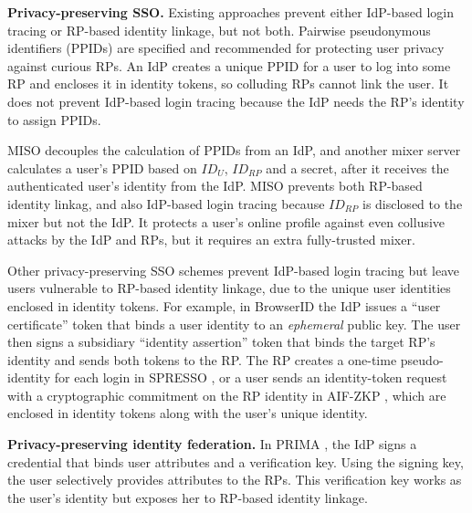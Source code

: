 \noindent\textbf{Privacy-preserving SSO.}
Existing approaches \cite{BrowserID, SPRESSO, NIST2017draft} prevent either IdP-based login tracing or RP-based identity linkage, but not both.
Pairwise pseudonymous identifiers (PPIDs) are specified \cite{OpenIDConnect, SAMLIdentifier} and recommended \cite{NIST2017draft}
for protecting user privacy against curious RPs.
An IdP creates a unique PPID for a user to log into some RP and encloses it in identity tokens, so colluding RPs cannot link the user.
It does not prevent IdP-based login tracing because the IdP needs the RP's identity to assign PPIDs.

MISO \cite{miso} decouples the calculation of PPIDs from an IdP,
        and another mixer server calculates a user's PPID
    based on $ID_U$, $ID_{RP}$ and a secret,
    after it receives the authenticated user's identity from the IdP.
MISO prevents both RP-based identity linkag, %
    and also IdP-based login tracing because $ID_{RP}$ is disclosed to the mixer but not the IdP.
It protects a user's online profile against even collusive attacks by the IdP and RPs,
    but it requires an extra fully-trusted mixer.


Other privacy-preserving SSO schemes prevent IdP-based login tracing but leave users vulnerable to RP-based identity linkage, due to the unique user identities enclosed in identity tokens.
For example, in BrowserID \cite{BrowserID} %
the IdP %
issues a ``user certificate'' token that binds a user identity to an \emph{ephemeral} public key. The user then signs a subsidiary ``identity assertion'' token that binds the target RP's identity and sends both tokens to the RP.
The RP creates a one-time pseudo-identity for each login in SPRESSO \cite{SPRESSO}, 
 or a user sends an identity-token request with a cryptographic commitment on the RP identity in AIF-ZKP \cite{save-flow,POIDC},
        which are enclosed in identity tokens along with the user's unique identity.

\noindent\textbf{Privacy-preserving identity federation.}
In PRIMA \cite{prima}, the IdP signs a credential
that binds user attributes and a verification key. Using the signing key, the user selectively provides attributes to the RPs. This verification key works as the user's identity but exposes her to RP-based identity linkage.

